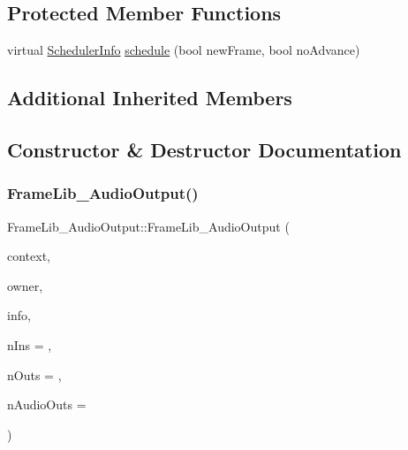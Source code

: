 \subsection*{Protected Member Functions}
\begin{DoxyCompactItemize}
\item 
virtual \hyperlink{struct_frame_lib___d_s_p_1_1_scheduler_info}{Scheduler\+Info} \hyperlink{class_frame_lib___audio_output_a39e97cc3e92147465cf1f6c267de185d}{schedule} (bool new\+Frame, bool no\+Advance)
\end{DoxyCompactItemize}
\subsection*{Additional Inherited Members}


\subsection{Constructor \& Destructor Documentation}
\mbox{\label{class_frame_lib___audio_output_aa63caeed1cdb5887b1a81f1de2b300a1}} 
\subsubsection{\texorpdfstring{Frame\+Lib\+\_\+\+Audio\+Output()}{FrameLib\_AudioOutput()}}
{\footnotesize\ttfamily Frame\+Lib\+\_\+\+Audio\+Output\+::\+Frame\+Lib\+\_\+\+Audio\+Output (\begin{DoxyParamCaption}\item[{\hyperlink{class_frame_lib___context}{Frame\+Lib\+\_\+\+Context}}]{context,  }\item[{void $\ast$}]{owner,  }\item[{\hyperlink{class_frame_lib___parameters_1_1_info}{Frame\+Lib\+\_\+\+Parameters\+::\+Info} $\ast$}]{info,  }\item[{unsigned long}]{n\+Ins = {},  }\item[{unsigned long}]{n\+Outs = {},  }\item[{unsigned long}]{n\+Audio\+Outs = {} }\end{DoxyParamCaption})\hspace{0.3cm}{\ttfamily [inline]}}



